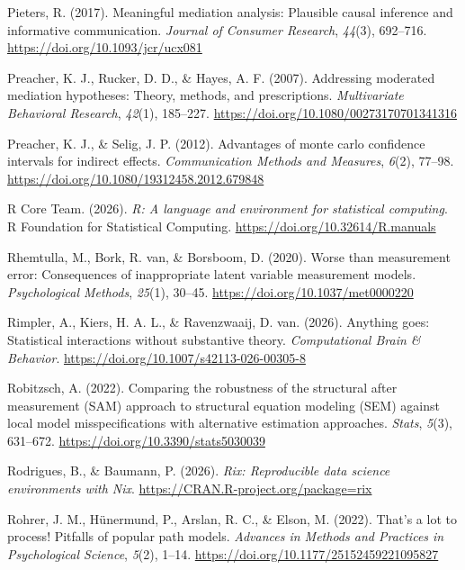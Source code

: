 \documentclass[
  man,
  longtable,
  nolmodern,
  notxfonts,
  notimes,
  colorlinks=true,linkcolor=blue,citecolor=blue,urlcolor=blue]{apa7}
\newlength{\cslhangindent}
\newenvironment{CSLReferences}[2] %
 {\begin{list}{}{%
  \setlength{\itemindent}{0pt}
  \setlength{\leftmargin}{0pt}
  \setlength{\parsep}{0pt}
  \ifodd #1
   \setlength{\leftmargin}{\cslhangindent}
   \setlength{\itemindent}{-1\cslhangindent}
  \fi
  \setlength{\itemsep}{#2\baselineskip}}}
 {\end{list}}
\begin{document}
\begin{CSLReferences}{1}{0}
Pieters, R. (2017). Meaningful mediation analysis: Plausible causal
inference and informative communication. \emph{Journal of Consumer
Research}, \emph{44}(3), 692--716.
\url{https://doi.org/10.1093/jcr/ucx081}

Preacher, K. J., Rucker, D. D., \& Hayes, A. F. (2007). Addressing
moderated mediation hypotheses: Theory, methods, and prescriptions.
\emph{Multivariate Behavioral Research}, \emph{42}(1), 185--227.
\url{https://doi.org/10.1080/00273170701341316}

Preacher, K. J., \& Selig, J. P. (2012). Advantages of monte carlo
confidence intervals for indirect effects. \emph{Communication Methods
and Measures}, \emph{6}(2), 77--98.
\url{https://doi.org/10.1080/19312458.2012.679848}

R Core Team. (2026). \emph{R: A language and environment for statistical
computing}. R Foundation for Statistical Computing.
\url{https://doi.org/10.32614/R.manuals}

Rhemtulla, M., Bork, R. van, \& Borsboom, D. (2020). Worse than
measurement error: Consequences of inappropriate latent variable
measurement models. \emph{Psychological Methods}, \emph{25}(1), 30--45.
\url{https://doi.org/10.1037/met0000220}

Rimpler, A., Kiers, H. A. L., \& Ravenzwaaij, D. van. (2026). Anything
goes: Statistical interactions without substantive theory.
\emph{Computational Brain \& Behavior}.
\url{https://doi.org/10.1007/s42113-026-00305-8}

Robitzsch, A. (2022). Comparing the robustness of the structural after
measurement ({SAM}) approach to structural equation modeling ({SEM})
against local model misspecifications with alternative estimation
approaches. \emph{Stats}, \emph{5}(3), 631--672.
\url{https://doi.org/10.3390/stats5030039}

Rodrigues, B., \& Baumann, P. (2026). \emph{Rix: Reproducible data
science environments with {Nix}}.
\url{https://CRAN.R-project.org/package=rix}

Rohrer, J. M., Hünermund, P., Arslan, R. C., \& Elson, M. (2022). That's
a lot to process! Pitfalls of popular path models. \emph{Advances in
Methods and Practices in Psychological Science}, \emph{5}(2), 1--14.
\url{https://doi.org/10.1177/25152459221095827}


\end{CSLReferences}
\end{document}
